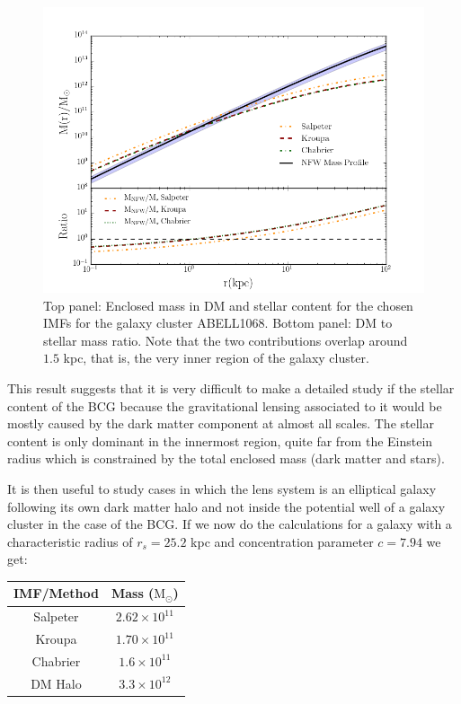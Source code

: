 \begin{figure}[H]
\centering
\includegraphics[width=12cm]{images/DM_fraction_all_IMFs.png}
\caption[Enclosed mass and DM to stellar mass ratio for a galaxy cluster]{Top panel: Enclosed mass in DM and stellar content for the chosen IMFs for the galaxy cluster ABELL1068. Bottom panel: DM to stellar mass ratio. Note that the two contributions overlap around $1.5 $ kpc, that is, the very inner region of the galaxy cluster.}
\end{figure}

This result suggests that it is very difficult to make a detailed study if the stellar content of the BCG because the gravitational lensing associated to it would be mostly caused by the dark matter component at almost all scales. The stellar content is only dominant in the innermost region, quite far from the Einstein radius which is constrained by the total enclosed mass (dark matter and stars).

It is then useful to study cases in which the lens system is an elliptical galaxy following its own dark matter halo and not inside the potential well of a galaxy cluster in the case of the BCG. If we now do the calculations for a galaxy with a characteristic radius of $r_s=25.2$ kpc and concentration parameter $c=7.94$ we get:

\begin{center}
\begin{tabular}{c c}
IMF/Method & Mass ($\text{M}_{\odot}$)\tabularnewline
\hline 
\hline
Salpeter & $2.62\times10^{11}$\tabularnewline
Kroupa & $1.70\times10^{11}$\tabularnewline
Chabrier & $1.6\times10^{11}$\tabularnewline
DM Halo & $3.3\times10^{12}$\tabularnewline
\end{tabular}
\end{center}

